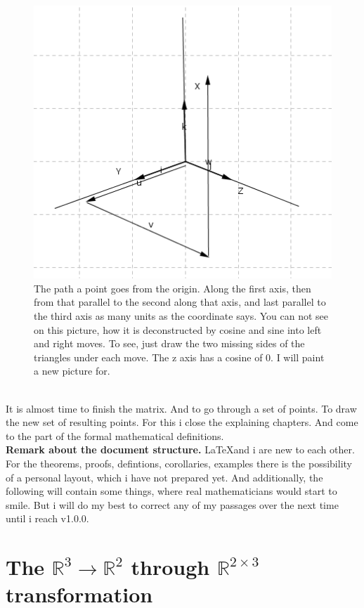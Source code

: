 \documentclass[a4paper]{article}
\begin{document}
\begin{figure}[ht]
\includegraphics{pathcoords.png}
\caption{The path a point goes from the origin. Along the first axis, then from that parallel to the second along that axis, and last parallel to the third axis as many units as the coordinate says. You can not see on this picture, how it is deconstructed by cosine and sine into left and right moves. To see, just draw the two missing sides of the triangles under each move. The z axis has a cosine of 0. I will paint a new picture for.}
\end{figure}\\

It is almost time to finish the matrix. And to go through a set of points. To draw the new set of resulting points.
For this i close the explaining chapters. And come to the part of the formal mathematical definitions.\\

\textbf{Remark about the document structure.} \LaTeX and i are new to each other. For the theorems, proofs, defintions, corollaries, examples there is the possibility of a personal layout, which i have not prepared yet. And additionally, the following will contain some things, where real
mathematicians would start to smile. But i will do my best to correct any of my passages over the next time until i reach v1.0.0.\\

\section{The $\mathbb{R}^{3} \rightarrow \mathbb{R}^{2}$ through $\mathbb{R}^{2\times{3}}$ transformation}
\end{document}
